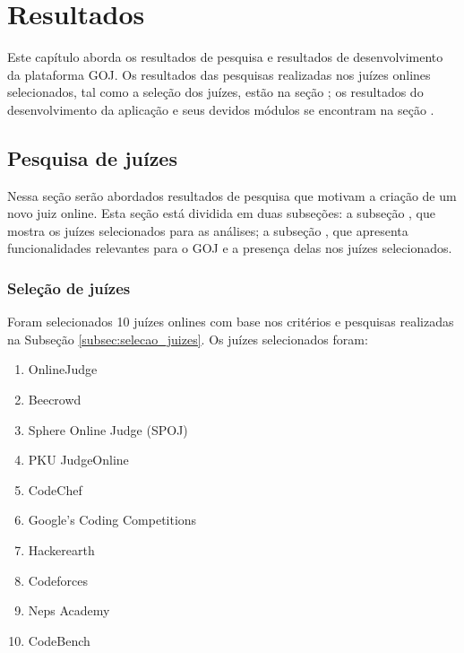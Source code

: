 \chapter{Resultados}
\label{cap:resultados}

Este capítulo aborda os resultados de pesquisa e resultados de desenvolvimento da plataforma GOJ. Os resultados das pesquisas realizadas nos juízes onlines selecionados, tal como a seleção dos juízes, estão na seção ; os resultados do desenvolvimento da aplicação e seus devidos módulos se encontram na seção .

\section{Pesquisa de juízes}
\label{sec:pesquisa_juizes}

Nessa seção serão abordados resultados de pesquisa que motivam a criação de um novo juiz online. Esta seção está dividida em duas subseções: a subseção , que mostra os juízes selecionados para as análises; a subseção , que apresenta funcionalidades relevantes para o GOJ e a presença delas nos juízes selecionados.

\subsection{Seleção de juízes}
\label{subsec:resultados_selecao_juizes}

Foram selecionados 10 juízes onlines com base nos critérios e pesquisas realizadas na Subseção \ref{subsec:selecao_juizes}. Os juízes selecionados foram:

\begin{enumerate}
    \item OnlineJudge
    \item Beecrowd
    \item Sphere Online Judge (SPOJ)
    \item PKU JudgeOnline
    \item CodeChef
    \item Google's Coding Competitions
    \item Hackerearth
    \item Codeforces
    \item Neps Academy 
    \item CodeBench
\end{enumerate}

